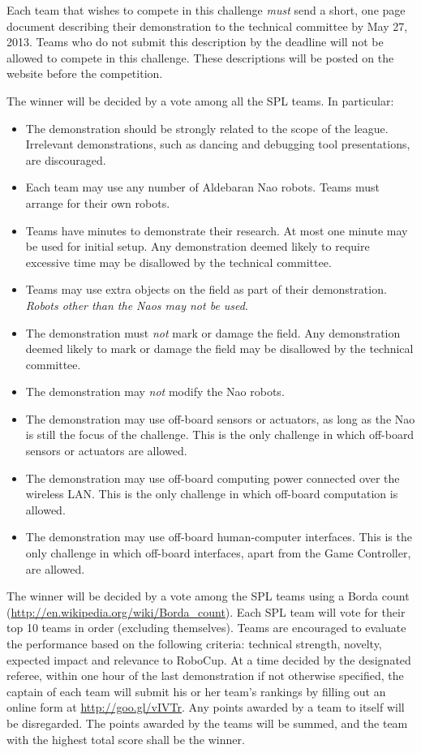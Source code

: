 \documentclass{article}
\begin{document}
Each team that wishes to compete in this challenge \emph{must} send a 
short, one page document describing their demonstration to the technical 
committee by May 27, 2013.  Teams who do not submit this description by 
the deadline will not be allowed to compete in this challenge. These 
descriptions will be posted on the website before the competition.

The winner will be decided by a vote among all the SPL teams. In particular:

\begin{itemize}
\item 
The demonstration should be strongly related to the scope of the league. 
Irrelevant demonstrations, such as dancing and debugging tool presentations, 
are discouraged.
\item 
Each team may use any number of Aldebaran Nao robots. Teams must arrange
for their own robots.
\item 
Teams have \openMinNum{} minutes to demonstrate their research. At most one 
minute may be used for initial setup. Any demonstration deemed
likely to require excessive time may be disallowed by the technical
committee.
\item 
Teams may use extra objects on the field as part of their
demonstration. \emph{Robots other than the Naos may not be used}.
\item 
The demonstration must \emph{not} mark or damage the field. Any
demonstration deemed likely to mark or damage the field may be
disallowed by the technical committee.
\item
The demonstration may \emph{not} modify the Nao robots.
\item 
The demonstration may use off-board sensors or actuators, as long 
as the Nao is still the focus of the challenge.  This is the only 
challenge in which off-board sensors or actuators are allowed.
\item 
The demonstration may use off-board computing power connected over the
wireless LAN. This is the only challenge in which off-board
computation is allowed.
\item 
The demonstration may use off-board human-computer interfaces. This
is the only challenge in which off-board interfaces, apart from the
Game Controller, are allowed.
\end{itemize}

The winner will be decided by a vote among the SPL teams using a Borda
count (\url{http://en.wikipedia.org/wiki/Borda_count}). Each SPL 
team will vote for their top 10 teams in order (excluding themselves).
Teams are encouraged to evaluate the performance based on the
following criteria: technical strength, novelty, expected impact and
relevance to RoboCup. At a time decided by the designated referee,
within one hour of the last demonstration if not otherwise
specified, the captain of each team will submit his or her team's rankings 
by filling out an online form at \url{http://goo.gl/vIVTr}.  Any points 
awarded by a team to itself will be disregarded. The points awarded by the 
teams will be summed, and the team with the highest total score shall be the winner.
\end{document}
